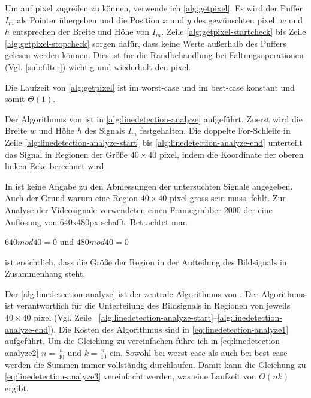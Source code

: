 Um auf \gls{pixel} zugreifen zu können, verwende ich \autoref{alg:getpixel}. Es wird der Puffer $I_m$ als Pointer
 übergeben und die Position $x$ und $y$ des gewünschten \gls{pixel}. $w$ und $h$ entsprechen der Breite und Höhe von
 $I_m$. Zeile \ref{alg:getpixel-startcheck} bis Zeile \ref{alg:getpixel-stopcheck} sorgen dafür, dass keine Werte
 außerhalb des Puffers gelesen werden können. Dies ist für die Randbehandlung bei Faltungsoperationen
 (Vgl. \autoref{sub:filter}) wichtig und wiederholt den \gls{pixel}.



Die Laufzeit von \autoref{alg:getpixel} ist im worst-case und im best-case konstant und somit $\Theta(1)$.

Der Algorithmus von \citeauthor{clarke96} ist in \autoref{alg:linedetection-analyze} aufgeführt. Zuerst wird die Breite
 $w$ und Höhe $h$ des Signals $I_m$ festgehalten. Die doppelte For-Schleife in Zeile
 \ref{alg:linedetection-analyze-start} bis \ref{alg:linedetection-analyze-end} unterteilt das Signal in Regionen der
 Größe $40 \times 40$ \gls{pixel}, indem die Koordinate der oberen linken Ecke berechnet wird.



In \citeauthor{clarke96} ist keine Angabe zu den Abmessungen der untersuchten Signale angegeben. Auch der Grund warum
 eine Region $40 \times 40$ \gls{pixel} gross sein muss, fehlt. Zur Analyse der Videosignale verwendeten
 \citeauthor{clarke96} einen Framegrabber 2000 der eine Auflösung von 640x480px schafft. Betrachtet man

$640 mod 40 = 0$ und $480 mod 40 = 0$

ist ersichtlich, dass die Größe der Region in der Aufteilung des Bildsignals in Zusammenhang steht.

Der \autoref{alg:linedetection-analyze} ist der zentrale Algorithmus von \citeauthor{clarke96}. Der Algorithmus
 ist verantwortlich für die Unterteilung des Bildsignals in Regionen von jeweils $40 \times 40$ \gls{pixel} (Vgl. Zeile
~\ref{alg:linedetection-analyze-start}--\ref{alg:linedetection-analyze-end}). Die Kosten des Algorithmus sind in \autoref{eq:linedetection-analyze1} aufgeführt. Um die Gleichung zu vereinfachen führe ich in \autoref{eq:linedetection-analyze2} $n = \tfrac{h}{40}$ und $k = \tfrac{w}{40}$ ein. Sowohl bei worst-case als auch bei best-case werden die Summen immer vollständig durchlaufen. Damit kann die Gleichung zu \autoref{eq:linedetection-analyze3} vereinfacht werden, was eine Laufzeit von $\Theta(nk)$ ergibt.

